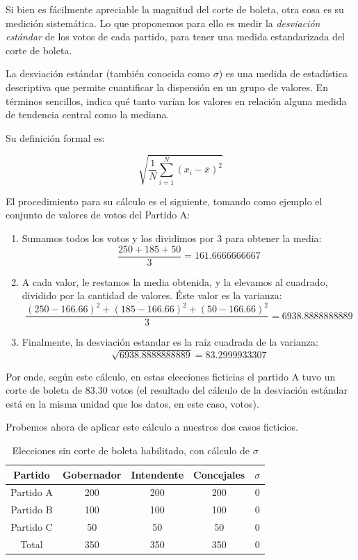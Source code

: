 \documentclass[12pt,a4paper]{article}
\begin{document}
Si bien es fácilmente apreciable la magnitud del corte de boleta, otra cosa es
su medición sistemática. Lo que proponemos para ello es medir la
\emph{desviación estándar} de los votos de cada partido, para tener una medida
estandarizada del corte de boleta.

La desviación estándar (también conocida como \(\sigma\)) es una medida de estadística descriptiva que permite cuantificar la dispersión en un grupo de valores. En términos sencillos, indica
qué tanto varían los valores en relación alguna medida de tendencia central como
la mediana.

Su definición formal es:

\[ \sqrt{\frac{1}{N} \sum_{i=1}^N (x_i - \overline{x})^2} \]

El procedimiento para su cálculo es el siguiente, tomando como ejemplo el
conjunto de valores de votos del Partido A:

\begin{enumerate}
  \item Sumamos todos los votos y los dividimos por 3 para obtener la media:
\[ \frac{250 + 185 + 50}{3} = 161.6666666667\]
  \item A cada valor, le restamos la media obtenida, y  la elevamos al cuadrado,
    dividido por la cantidad de valores. Éste valor es la varianza:
\[\frac{(250 - 166.66)^2 + (185 - 166.66)^2 + (50-166.66)^2}{3} = 6938.8888888889\]
  \item Finalmente, la desviación estandar es la raíz cuadrada de la varianza:
\[\sqrt{6938.8888888889} = 83.2999933307\]
\end{enumerate}

Por ende, según este cálculo, en estas elecciones ficticias el partido A tuvo un
corte de boleta de 83.30 votos (el resultado del cálculo de la desviación
estándar está en la misma unidad que los datos, en este caso, votos).

Probemos ahora de aplicar este cálculo a nuestros dos casos ficticios.

\renewcommand{\arraystretch}{1.25}
\begin{table}[h!]
\centering
\begin{tabular}{c c c c c} 
 Partido & Gobernador & Intendente & Concejales & \(\sigma\) \\ [0.5ex] 
 \hline
Partido A & 200 & 200 & 200 & 0 \\
Partido B & 100 & 100 & 100 & 0 \\
Partido C & 50 & 50 & 50 & 0 \\
 \hline
Total & 350 & 350 & 350 & 0 \\ [1ex]
 \hline
\end{tabular}
\caption{Elecciones sin corte de boleta habilitado, con cálculo de \(\sigma\)}
\label{table:1}
\end{table}
\end{document}
